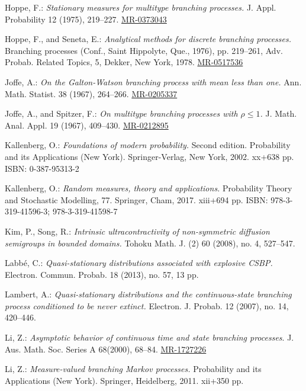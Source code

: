 \documentclass[12pt,a4paper]{amsart}
\numberwithin{equation}{section}
\theoremstyle{plain}
\theoremstyle{definition}
\theoremstyle{remark}
\def\MR#1{\href{http://www.ams.org/mathscinet-getitem?mr=#1}{MR-#1}}
\begin{document}
\begin{thebibliography}{99}
	Hoppe, F.:
	\emph{Stationary measures for multitype branching processes.}
	J. Appl. Probability 12 (1975), 219--227.
	\MR{0373043}
	
	Hoppe, F., and Seneta, E.:
	\emph{Analytical methods for discrete branching processes.}
	Branching processes (Conf., Saint Hippolyte, Que., 1976), pp. 219--261, 
	Adv. Probab. Related Topics, 5, Dekker, New York, 1978.
	\MR{0517536}
	
	Joffe, A.:
	\emph{On the Galton-Watson branching process with mean less than one.}
	Ann. Math. Statist. 38 (1967), 264--266.
	\MR{0205337}
	
	Joffe, A., and Spitzer, F.:
	\emph{On multitype branching processes with $\rho \leq 1$.}
	J. Math. Anal. Appl. 19 (1967), 409--430.
	\MR{0212895}
	
	Kallenberg, O.:
	\emph{Foundations of modern probability.}
	Second edition. Probability and its Applications (New York). Springer-Verlag, New York, 2002. xx+638 pp. ISBN: 0-387-95313-2
	
	Kallenberg, O.:
	\emph{Random measures, theory and applications.}
	Probability Theory and Stochastic Modelling, 77. Springer, Cham, 2017. xiii+694 pp. ISBN: 978-3-319-41596-3; 978-3-319-41598-7
	
	Kim, P., Song, R.:
	\emph{Intrinsic ultracontractivity of non-symmetric diffusion semigroups in bounded domains.}
	Tohoku Math. J. (2) 60 (2008), no. 4, 527--547.
	
	Labb\'e, C.:
	\emph{Quasi-stationary distributions associated with explosive CSBP.}
	Electron. Commun. Probab. 18 (2013), no. 57, 13 pp.
	
	Lambert, A.:
	\emph{Quasi-stationary distributions and the continuous-state branching process conditioned to be never extinct.}
	Electron. J. Probab. 12 (2007), no. 14, 
	420--446.

	 Li, Z.:
	\emph{Asymptotic behavior of continuous time and state branching processes}. 
	J. Aus. Math. Soc. Series A 68(2000), 68--84. 
	\MR{1727226}

	Li, Z.:
	\emph{Measure-valued branching Markov processes.}
	Probability and its Applications (New York). Springer, Heidelberg, 2011. xii+350 pp.
	

\end{thebibliography}
\end{document}
